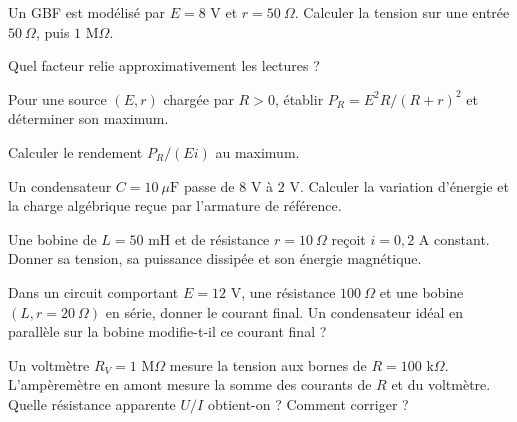 \begin{questions}
\item Un GBF est modélisé par $E=8$ V et $r=50\ \Omega$. Calculer la tension sur une entrée $50\ \Omega$, puis $1$ M$\Omega$.
\item Quel facteur relie approximativement les lectures ?
\end{questions}

\begin{questions}
\item Pour une source $(E,r)$ chargée par $R>0$, établir $P_R=E^2R/(R+r)^2$ et déterminer son maximum.
\item Calculer le rendement $P_R/(Ei)$ au maximum.
\end{questions}



\begin{questions}
\item Un condensateur $C=10\ \mu\mathrm{ F}$ passe de $8$ V à $2$ V. Calculer la variation d’énergie et la charge algébrique reçue par l’armature de référence.
\end{questions}

\begin{questions}
\item Une bobine de $L=50$ mH et de résistance $r=10\ \Omega$ reçoit $i=0{,}2$ A constant. Donner sa tension, sa puissance dissipée et son énergie magnétique.
\end{questions}

\begin{questions}
\item Dans un circuit comportant $E=12$ V, une résistance $100\ \Omega$ et une bobine $(L,r=20\ \Omega)$ en série, donner le courant final. Un condensateur idéal en parallèle sur la bobine modifie-t-il ce courant final ?
\end{questions}



\begin{questions}
\item Un voltmètre $R_V=1$ M$\Omega$ mesure la tension aux bornes de $R=100$ k$\Omega$. L’ampèremètre en amont mesure la somme des courants de $R$ et du voltmètre. Quelle résistance apparente $U/I$ obtient-on ? Comment corriger ?
\end{questions}

